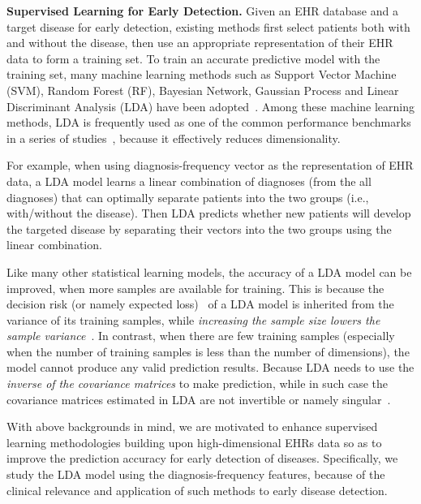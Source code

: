\textbf{Supervised Learning for Early Detection.} Given an EHR database and a target disease for early detection, existing methods first select patients both with and without the disease, then use an appropriate representation of their EHR data to form a training set.
To train an accurate predictive model with the training set, many machine learning methods such as Support Vector Machine (SVM), Random Forest (RF), Bayesian Network, Gaussian Process and Linear Discriminant Analysis (LDA) have been adopted~\cite{sun2012supervised,7091853,personalized2015,zhang_mseq_2015,jensen2001mining,liu_temporal_2015,cazzanti_local_2007}. Among these machine learning methods, LDA is frequently used as one of the common performance benchmarks in a series of studies~\cite{cazzanti_local_2007,zhang_mseq_2015,kalina2013selecting,karlsson2014handling,wang2014clinical}, because it effectively reduces dimensionality.

For example, when using diagnosis-frequency vector as the representation of EHR data, a LDA model learns a linear combination of diagnoses (from the all diagnoses) that can optimally separate patients into the two groups (i.e., with/without the disease).
Then LDA predicts whether new patients will develop the targeted disease by separating their vectors into the two groups using the linear combination.
 
Like many other statistical learning models, the accuracy of a LDA model can be improved, when more samples are available for training.
This is because the decision risk (or namely expected loss)~\cite{berger2013statistical} of a LDA model is inherited from the variance of its training samples, while \emph{increasing the sample size lowers the sample variance}~\cite{hsu1947complete,qiao2008effective}. In contrast, when there are few training samples (especially when the number of training samples is less than the number of dimensions), the model cannot produce any valid prediction results.
%
Because LDA needs to use the \emph{inverse of the covariance matrices} to make prediction, while in such case the covariance matrices estimated in LDA are not invertible or namely singular~\cite{huang2002solving,gao2006direct}.
 

With above backgrounds in mind, we are motivated to enhance supervised learning methodologies building upon high-dimensional EHRs data so as to improve the prediction accuracy for early detection of diseases. Specifically, we study the LDA model using the diagnosis-frequency features, because of the clinical relevance and application of such methods to early disease detection.
 

